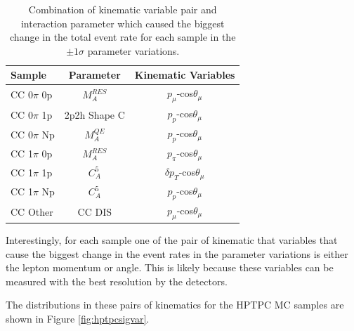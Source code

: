 \begin{center}
\begin{table}[!htbp]
\center
\begin{tabular}{l ||c c}
\hline \hline
\textbf{Sample} & \textbf{Parameter} & \textbf{Kinematic Variables} \\
 \hline \hline
CC 0$\pi$ 0p & $M_{A}^{RES}$ & $p_{\mu}$-cos$\theta_{\mu}$\\
CC 0$\pi$ 1p & 2p2h Shape C & $p_{p}$-cos$\theta_{\mu}$\\
CC 0$\pi$ Np & $M_{A}^{QE}$ & $p_{p}$-cos$\theta_{\mu}$\\
CC 1$\pi$ 0p & $M_{A}^{RES}$ & $p_{\pi}$-cos$\theta_{\mu}$\\
CC 1$\pi$ 1p & $C_{A}^{5}$ & $\delta p_{T}$-cos$\theta_{\mu}$\\
CC 1$\pi$ Np & $C_{A}^{5}$ & $p_{p}$-cos$\theta_{\mu}$\\
CC Other & CC DIS & $p_{\mu}$-cos$\theta_{\mu}$\\
\hline \hline
\end{tabular}
\caption{Combination of kinematic variable pair and interaction parameter which caused the biggest change in the total event rate for each sample in the $\pm1\sigma$ parameter variations.}
\label{tab:hptpcsigvar}
\end{table}
\end{center}

Interestingly, for each sample one of the pair of kinematic that  variables that cause the biggest change in the event rates in the parameter variations is either the lepton momentum or angle. This is likely because these variables can be measured with the best resolution by the detectors.

The distributions in these pairs of kinematics for the HPTPC MC samples are shown in Figure \ref{fig:hptpcsigvar}.


